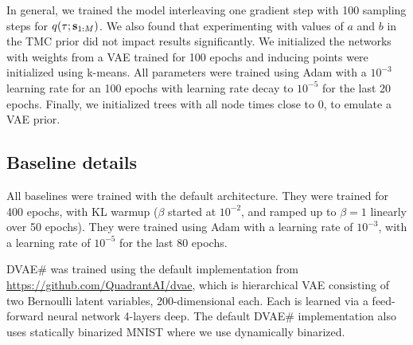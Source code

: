 In general, we trained the model interleaving
one gradient step with 100 sampling steps for $q(\tau; \mathbf{s}_{1:M})$.
We also found that experimenting with values of $a$ and $b$
in the TMC prior did not impact results significantly.
We initialized the networks with weights
from a VAE trained for 100 epochs and inducing points
were initialized using k-means. All parameters
were trained using Adam \citep{Kingma2014adam} with a $10^{-3}$ learning rate
for an 100 epochs with learning rate decay to $10^{-5}$ for the last 20 epochs. 
Finally, we initialized trees with all node times close to 0,
to emulate a VAE prior.

\subsection{Baseline details}
All baselines were trained with the default architecture.
They were trained for 400 epochs,
with KL warmup ($\beta$ started at $10^{-2}$, and ramped up to $\beta = 1$
linearly over 50 epochs). They were trained using Adam with a
learning rate of $10^{-3}$, with a learning rate of $10^{-5}$ for
the last 80 epochs.

DVAE\# was trained using the default implementation from
\url{https://github.com/QuadrantAI/dvae}, which is hierarchical
VAE consisting of two Bernoulli latent variables, 200-dimensional each.
Each is learned via a feed-forward neural network 4-layers deep.
The default DVAE\# implementation also uses statically binarized MNIST
where we use dynamically binarized.
